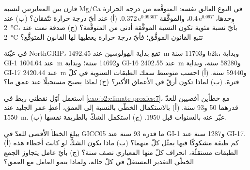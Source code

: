 \begin{exercise}[$\star\star$]\label{exo:b2:climate-proxies:6}
قارن بين المعايرتين لنسبة Mg/Ca في النوع العالق نفسه: المتوقَّعة من
درجة الحرارة وحدها، $0.4\,\mathrm{e}^{0.09T}$، والموفَّقة $0.372\,\mathrm{e}^{0.0936T}$. (أ) عند
أيّ درجة حرارة تتّفقان؟ (ب) عند \qty{2}{\celsius}، بأيّ نسبة مئوية تكون النسبة الموفَّقة
أدنى من المتوقَّعة؟ (ج) صدفة نمت عند \qty{2}{\celsius} تتبع القانون الموفَّق؛ فأيّ
درجة حرارة يعطيها لها القانون المتوقَّع؟
\end{exercise}

\begin{exercise}[$\star\star$]\label{exo:b2:climate-proxies:7}
في عيّنة NorthGRIP، تقع بداية الهولوسين عند \qty{1492.45}{m} و\num{11703} سنة
b2k، وبداية GI-1 عند \qty{1604.64}{m} و\num{14692} سنة؛ وبداية GI-16 عند
\qty{2402.55}{m} و\num{58280} سنة، وبداية GI-17 عند \qty{2420.44}{m} و\num{59440} سنة.
(أ) احسب متوسط سمك الطبقات السنوية في كلّ فترة. (ب) لماذا تكون أرقّ
في الأعماق الأكبر؟ (ج) لماذا يصبح  مستحيلًا عند عمق ما؟
\end{exercise}

\begin{exercise}[$\star\star$]\label{exo:b2:climate-proxies:8}
استعمل أوّل نقطتي ربط في \cref{exo:b2:climate-proxies:7}، مع خطأين أقصيين للعدّ قدرهما 50
و93 سنة. (أ) بالاستكمال الخطّي بالنسبة إلى العمق، أعطِ عمر الجليد عند \qty{1550}{m}.
(ب) عبّر عنه بالسنوات قبل 1950. (ج) استكمل الشكّ بالطريقة نفسها.
\end{exercise}

\begin{exercise}[$\star\star$]\label{exo:b2:climate-proxies:9}
يبلغ الخطأ الأقصى للعدّ في GICC05 ما قدره 93 سنة عند GI-1 و\num{1287} سنة عند GI-17. (أ) كم
طبقة مشكوكًا فيها يمثّل كلّ منهما؟ (ب) ماذا يكون الشكّ لو كانت أخطاء هذه
الطبقات مستقلّة، انحراف كلّ منها المعياري نصف سنة؟ (ج) بأيّ عامل يتجاوز
الجمع الخطّي التقدير المستقلّ في كلّ حالة، ولماذا ينمو العامل مع العمق؟
\end{exercise}

